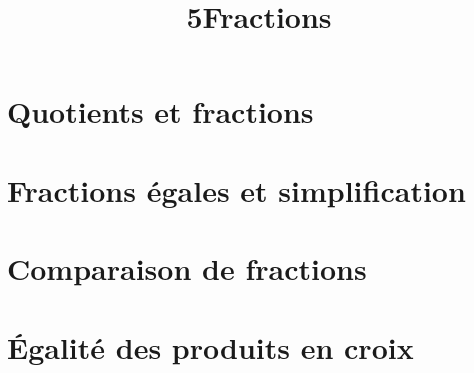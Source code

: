 \documentclass[12pt,a4paper]{article}
\date{}
\title{\textcircled{{\normalsize{5}}}Fractions}
\begin{document}
	\maketitle








\vspace{-0.5cm}

\section{Quotients et fractions}



%
%

\section{Fractions égales et simplification}



\section{Comparaison de fractions}



\newpage

\section{\'Egalité des produits en croix}


%

%
\end{document}
